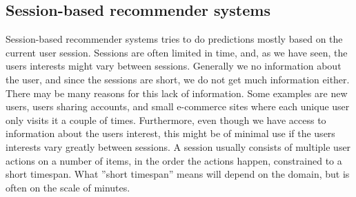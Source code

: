 \subsection{Session-based recommender systems}
Session-based recommender systems tries to do predictions mostly based on the current user session. Sessions are often limited in time, and, as we have seen, the users interests might vary between sessions. Generally we no information about the user, and since the sessions are short, we do not get much information either. There may be many reasons for this lack of information. Some examples are new users, users sharing accounts, and small e-commerce sites where each unique user only visits it a couple of times. Furthermore, even though we have access to information about the users interest, this might be of minimal use if the users interests vary greatly between sessions. A session usually consists of multiple user actions on a number of items, in the order the actions happen, constrained to a short timespan. What ''short timespan'' means will depend on the domain, but is often on the scale of minutes.\\




